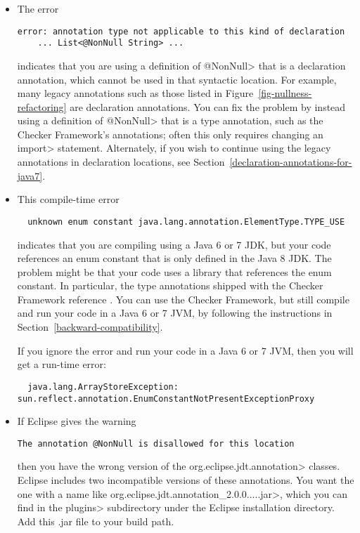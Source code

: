 \begin{itemize}
\item
The error

\begin{Verbatim}
error: annotation type not applicable to this kind of declaration
    ... List<@NonNull String> ...
\end{Verbatim}

\noindent
indicates that you are using a definition of \<@NonNull> that is a
declaration annotation, which cannot be used in that syntactic location.
For example, many legacy annotations such as those listed in
Figure~\ref{fig-nullness-refactoring} are declaration annotations.  You can
fix the problem by instead using a definition of \<@NonNull> that is a type
annotation, such as the Checker Framework's annotations; often this only
requires changing an \<import> statement.
Alternately, if you wish to continue using the legacy annotations in
declaration locations, see Section~\ref{declaration-annotations-for-java7}.


\item
This compile-time error

\begin{Verbatim}
  unknown enum constant java.lang.annotation.ElementType.TYPE_USE
\end{Verbatim}

\noindent
indicates that you are compiling using a Java 6 or 7 JDK, but your code
references an enum constant that is only defined in the Java 8 JDK.  The
problem might be that your code uses a library that references the enum
constant.  In particular, the type annotations shipped with the Checker
Framework reference
.  You can use the Checker
Framework, but still compile and run your code in a Java 6 or 7 JVM, by
following the instructions in Section~\ref{backward-compatibility}.

If you ignore the error and run your code in a Java 6 or 7 JVM, then you will get a run-time error:

\begin{Verbatim}
  java.lang.ArrayStoreException: sun.reflect.annotation.EnumConstantNotPresentExceptionProxy
\end{Verbatim}


\item
If Eclipse gives the warning

\begin{Verbatim}
The annotation @NonNull is disallowed for this location
\end{Verbatim}

\noindent
then you have the wrong version of the \<org.eclipse.jdt.annotation>
classes.  Eclipse includes two incompatible versions of these annotations.
You want the one with a name like
\<org.eclipse.jdt.annotation\_2.0.0.....jar>, which you can find in the
\<plugins> subdirectory under the Eclipse installation directory.
Add this .jar file to your build path.


\end{itemize}


